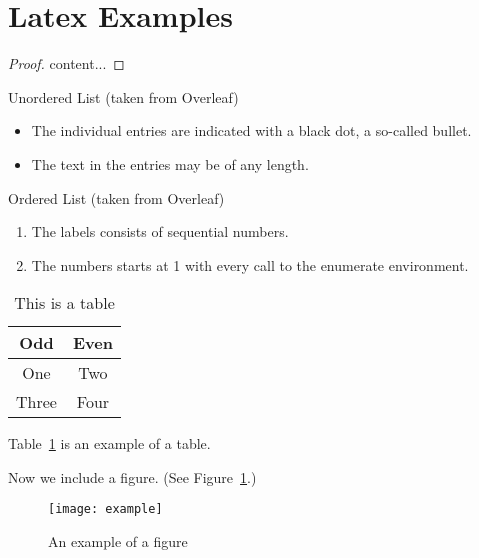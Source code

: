 	\section{Latex Examples}
	\label{sec:examples}
	
	\begin{theorem}
	\label{thrm:1}
		\lipsum[4]
	\end{theorem}
	\begin{proof}
		content...
	\end{proof}
	
	\begin{corollary}
	\label{cor:1}
	
	\lipsum[5]
	\end{corollary}
	
	Unordered List (taken from Overleaf)
	\begin{itemize}
		\item The individual entries are indicated with a black dot, a so-called bullet.
		\item The text in the entries may be of any length.
	\end{itemize}

	Ordered List (taken from Overleaf)
	\begin{enumerate}
		\item The labels consists of sequential numbers.
		\item The numbers starts at 1 with every call to the enumerate environment.
	\end{enumerate}

	\begin{table}[ht]
		\centering
		\begin{tabular}{|c|c|}
			\hline
			\textbf{Odd} & \textbf{Even} \\
			\hline\hline
			One & Two \\
			\hline
			Three & Four \\
			\hline
		\end{tabular}
		\caption{This is a table}
		\label{tbl:1}
	\end{table}

	Table~\ref{tbl:1} is an example of a table.
	
	Now we include a figure.
	(See Figure~\ref{fig:example}.)
	\begin{figure}[ht]
		\centering
		\texttt{[image: example]}
		\caption{An example of a figure}
		\label{fig:example}
	\end{figure}
	

	
%	